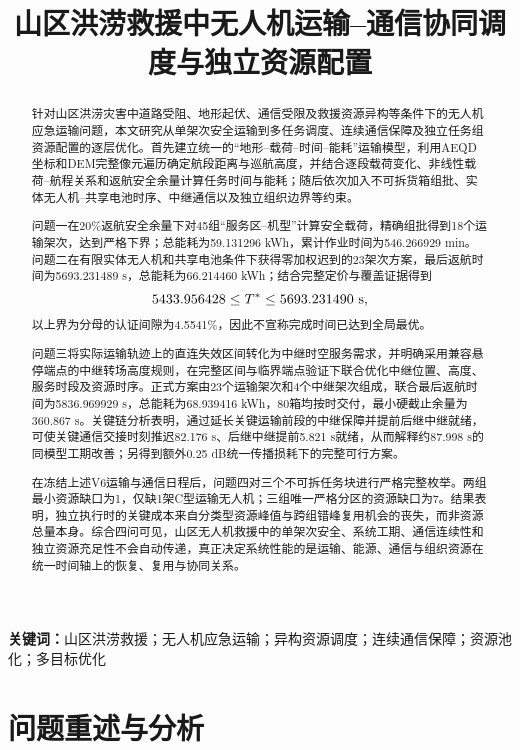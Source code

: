 \documentclass[UTF8,a4paper,12pt]{ctexart}
\title{山区洪涝救援中无人机运输--通信协同调度与独立资源配置}
\author{}
\date{}
\begin{document}
\maketitle


\begin{abstract}
针对山区洪涝灾害中道路受阻、地形起伏、通信受限及救援资源异构等条件下的无人机应急运输问题，本文研究从单架次安全运输到多任务调度、连续通信保障及独立任务组资源配置的逐层优化。首先建立统一的“地形--载荷--时间--能耗”运输模型，利用AEQD坐标和DEM完整像元遍历确定航段距离与巡航高度，并结合逐段载荷变化、非线性载荷--航程关系和返航安全余量计算任务时间与能耗；随后依次加入不可拆货箱组批、实体无人机--共享电池时序、中继通信以及独立组织边界等约束。

问题一在20\%返航安全余量下对45组“服务区--机型”计算安全载荷，精确组批得到18个运输架次，达到严格下界；总能耗为59.131296 kWh，累计作业时间为546.266929 min。问题二在有限实体无人机和共享电池条件下获得零加权迟到的23架次方案，最后返航时间为5693.231489 s，总能耗为66.214460 kWh；结合完整定价与覆盖证据得到
\[
5433.956428\le T^*\le5693.231490\ {\rm s},
\]
以上界为分母的认证间隙为4.5541\%，因此不宣称完成时间已达到全局最优。

问题三将实际运输轨迹上的直连失效区间转化为中继时空服务需求，并明确采用兼容悬停端点的中继转场高度规则，在完整区间与临界端点验证下联合优化中继位置、高度、服务时段及资源时序。正式方案由23个运输架次和4个中继架次组成，联合最后返航时间为5836.969929 s，总能耗为68.939416 kWh，80箱均按时交付，最小硬截止余量为360.867 s。关键链分析表明，通过延长关键运输前段的中继保障并提前后继中继就绪，可使关键通信交接时刻推迟82.176 s、后继中继提前5.821 s就绪，从而解释约87.998 s的同模型工期改善；另得到额外0.25 dB统一传播损耗下的完整可行方案。

在冻结上述V6运输与通信日程后，问题四对三个不可拆任务块进行严格完整枚举。两组最小资源缺口为1，仅缺1架C型运输无人机；三组唯一严格分区的资源缺口为7。结果表明，独立执行时的关键成本来自分类型资源峰值与跨组错峰复用机会的丧失，而非资源总量本身。综合四问可见，山区无人机救援中的单架次安全、系统工期、通信连续性和独立资源充足性不会自动传递，真正决定系统性能的是运输、能源、通信与组织资源在统一时间轴上的恢复、复用与协同关系。
\end{abstract}

\noindent\textbf{关键词：}山区洪涝救援；无人机应急运输；异构资源调度；连续通信保障；资源池化；多目标优化


\tableofcontents
\newpage


\section{问题重述与分析}
\label{sec:problem_analysis}
\end{document}
